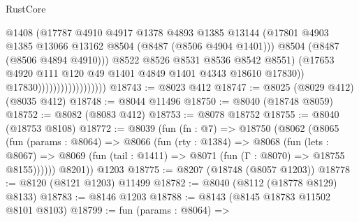 \begin{lexlean}{RustCore}
\begin{coremodule}
                                            @1408
                                            (@17787
                                              @4910
                                              @4917
                                              @1378
                                              @4893
                                              @1385
                                              @13144
                                              (@17801
                                                @4903
                                                @1385
                                                @13066
                                                @13162
                                                @8504
                                                (@8487 (@8506 @4904 @1401)))
                                              @8504
                                              (@8487 (@8506 @4894 @4910)))
                                            @8522
                                            @8526
                                            @8531
                                            @8536
                                            @8542
                                            @8551)
                                          (@17653
                                            @4920
                                            @111
                                            @120
                                            @49
                                            @1401
                                            @4849
                                            @1401
                                            @4343
                                            @18610
                                            @17830))
                                        @17830))))))))))))))))))
@18743 := @8023 @412
@18747 := @8025 (@8029 @412) (@8035 @412)
@18748 := @8044 @11496
@18750 := @8040 (@18748 @8059)
@18752 := @8082 (@8083 @412)
@18753 := @8078 @18752
@18755 := @8040 (@18753 @8108)
@18772 := @8039
    (fun (fn : @7) =>
    @18750
      (@8062
        (@8065
          (fun (params : @8064) =>
          @8066
            (fun (rty : @1384) =>
            @8068
              (fun (lets : @8067) =>
              @8069 (fun (tail : @1411) => @8071 (fun (Γ : @8070) => @18755 @8155))))))
        @8201))
    @1203
@18775 := @8207 (@18748 (@8057 @1203))
@18778 := @8120 (@8121 @1203) @11499
@18782 := @8040 (@8112 (@18778 @8129) @8133)
@18783 := @8146 @1203
@18788 := @8143 (@8145 @18783 @11502 @8101 @8103)
@18799 := fun (params : @8064) =>

\end{coremodule}
\end{lexlean}
